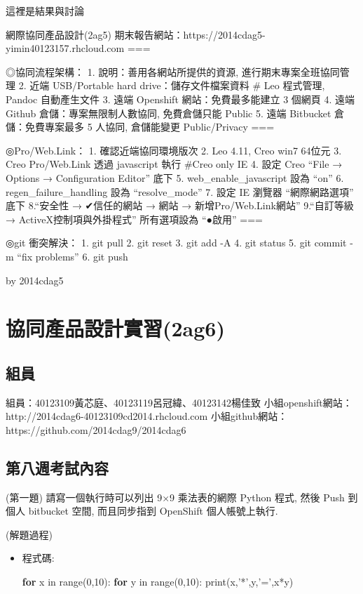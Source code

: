 \documentclass[]{article}
\newenvironment{Shaded}{}{}
\newcommand{\KeywordTok}[1]{\textcolor[rgb]{0.00,0.44,0.13}{\textbf{{#1}}}}
\newcommand{\DataTypeTok}[1]{\textcolor[rgb]{0.56,0.13,0.00}{{#1}}}
\newcommand{\DecValTok}[1]{\textcolor[rgb]{0.25,0.63,0.44}{{#1}}}
\newcommand{\StringTok}[1]{\textcolor[rgb]{0.25,0.44,0.63}{{#1}}}
\newcommand{\NormalTok}[1]{{#1}}
\begin{document}
這裡是結果與討論

網際協同產品設計(2ag5)
期末報告網站：https://2014cdag5-yimin40123157.rhcloud.com ===

◎協同流程架構： 1. 說明：善用各網站所提供的資源,
進行期末專案全班協同管理 2. 近端 USB/Portable hard
drive：儲存文件檔案資料 \# Leo 程式管理, Pandoc 自動產生文件 3. 遠端
Openshift 網站：免費最多能建立 3 個網頁 4. 遠端 Github
倉儲：專案無限制人數協同, 免費倉儲只能 Public 5. 遠端 Bitbucket
倉儲：免費專案最多 5 人協同, 倉儲能變更 Public/Privacy ===

◎Pro/​Web.Link： 1. 確認近端協同環境版次 2. Leo 4.11, Creo win7 64位元
3. Creo Pro/​Web.Link 透過 javascript 執行 \#Creo only IE 4. 設定 Creo
``File → Options → Configuration Editor'' 底下 5.
web\_enable\_javascript 設為 ``on'' 6. regen\_failure\_handling 設為
``resolve\_mode'' 7. 設定 IE 瀏覽器 ``網際網路選項'' 底下 8.``安全性 →
✔信任的網站 → 網站 → 新增Pro/​Web.Link網站'' 9.``自訂等級 →
ActiveX控制項與外掛程式'' 所有選項設為 ``●啟用'' ===

◎git 衝突解決： 1. git pull 2. git reset 3. git add -A 4. git status 5.
git commit -m ``fix problems'' 6. git push

by 2014cdag5

\section{協同產品設計實習(2ag6)}\label{ux5354ux540cux7522ux54c1ux8a2dux8a08ux5be6ux7fd22ag6}

\subsection{組員}\label{ux7d44ux54e1-1}

組員：40123109黃芯庭、40123119呂冠緯、40123142楊佳致
小組openshift網站：http://2014cdag6-40123109cd2014.rhcloud.com
小組github網站：https://github.com/2014cdag9/2014cdag6

\subsection{第八週考試內容}\label{ux7b2cux516bux9031ux8003ux8a66ux5167ux5bb9}

(第一題) 請寫一個執行時可以列出 9×9 乘法表的網際 Python 程式, 然後 Push
到個人 bitbucket 空間, 而且同步指到 OpenShift 個人帳號上執行.

(解題過程)

\begin{itemize}
\item
  程式碼:

\begin{Shaded}
\begin{Highlighting}[]
    \KeywordTok{for} \NormalTok{x in }\DataTypeTok{range}\NormalTok{(}\DecValTok{0}\NormalTok{,}\DecValTok{10}\NormalTok{):}
        \KeywordTok{for} \NormalTok{y in }\DataTypeTok{range}\NormalTok{(}\DecValTok{0}\NormalTok{,}\DecValTok{10}\NormalTok{):}
            \DataTypeTok{print}\NormalTok{(x,}\StringTok{'*'}\NormalTok{,y,}\StringTok{'='}\NormalTok{,x*y)}
\end{Highlighting}
\end{Shaded}
\end{itemize}
\end{document}

